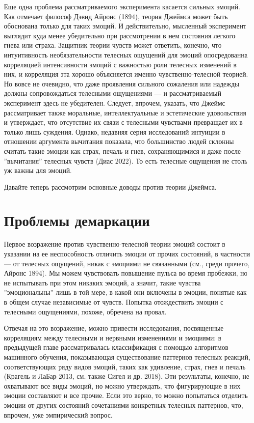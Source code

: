 \documentclass[11pt]{book}
\begin{document}
Еще одна проблема рассматриваемого эксперимента касается сильных эмоций. Как отмечает философ Дэвид Айронс (1894), теория Джеймса может быть обоснована только для таких эмоций. И действительно, мысленный эксперимент выглядит куда менее убедительно при рассмотрении в нем состояния легкого гнева или страха. Защитник теории чувств может ответить, конечно, что интуитивность необязательности телесных ощущений для эмоций опосредованна корреляцией интенсивности эмоций с важностью роли телесных изменений в них, и корреляция эта хорошо объясняется именно чувственно-телесной теорией. Но вовсе не очевидно, что даже проявления сильного сожаления или надежды должны сопровождаться телесными ощущениями --- и рассматриваемый эксперимент здесь не убедителен. Следует, впрочем, указать, что Джеймс рассматривает также моральные, интеллектуальные и эстетические удовольствия и утверждает, что отсутствие их связи с телесными чувствами превращает их в только лишь суждения. Однако, недавняя серия исследований интуиции в отношении аргумента вычитания показала, что большинство людей склонны считать такие эмоции как страх, печаль и гнев, сохраняющимися и даже после ''вычитания'' телесных чувств (Диас 2022). То есть телесные ощущения не столь уж важны для эмоций.

Давайте теперь рассмотрим основные доводы против теории Джеймса.

\section{Проблемы демаркации}

Первое возражение против чувственно-телесной теории эмоций состоит в указании на ее неспособность отличить эмоции от прочих состояний, в частности --- от телесных ощущений, никак с эмоциями не связанными (см., среди прочего, Айронс 1894). Мы можем чувствовать повышение пульса во время пробежки, но не испытывать при этом никаких эмоций, а значит, такие чувства ''эмоциональны'' лишь в той мере, в какой они включены в эмоции, понятые как в общем случае независимые от чувств. Попытка отождествить эмоции с телесными ощущениями, похоже, обречена на провал.

Отвечая на это возражение, можно привести исследования, посвященные корреляциям между телесными и нервными изменениями и эмоциями: в предыдущей главе рассматривалась классификация с помощью алгоритмов машинного обучения, показывающая существование паттернов телесных реакций, соответствующих ряду видов эмоций, таких как удивление, страх, гнев и печаль (Крагель и ЛаБар 2013, см. также Сигел и др. 2018). Эти результаты, конечно, не охватывают все виды эмоций, но можно утверждать, что фигурирующие в них эмоции составляют и все прочие. Если это верно, то можно попытаться отделить эмоции от других состояний сочетаниями конкретных телесных паттернов, что, впрочем, уже эмпирический вопрос.
\end{document}
